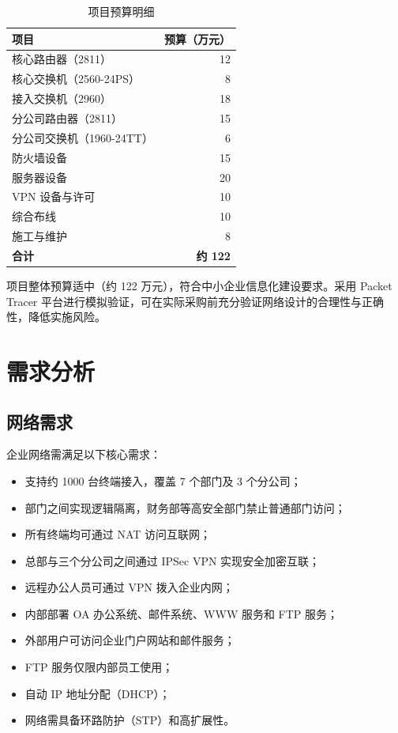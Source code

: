 \documentclass[12pt,a4paper]{ctexart}
\begin{document}
\begin{table}[H]
\centering
\caption{项目预算明细}
\begin{tabular}{|l|r|}
\hline
\textbf{项目}          & \textbf{预算（万元）} \\ \hline
核心路由器（2811）      & 12                   \\ \hline
核心交换机（2560-24PS） & 8                    \\ \hline
接入交换机（2960）      & 18                   \\ \hline
分公司路由器（2811）    & 15                   \\ \hline
分公司交换机（1960-24TT）& 6                    \\ \hline
防火墙设备              & 15                   \\ \hline
服务器设备              & 20                   \\ \hline
VPN 设备与许可          & 10                   \\ \hline
综合布线                & 10                   \\ \hline
施工与维护              & 8                    \\ \hline
\textbf{合计}          & \textbf{约 122}      \\ \hline
\end{tabular}
\end{table}

项目整体预算适中（约 122 万元），符合中小企业信息化建设要求。采用 Packet Tracer 平台进行模拟验证，可在实际采购前充分验证网络设计的合理性与正确性，降低实施风险。

\section{需求分析}

\subsection{网络需求}

企业网络需满足以下核心需求：

\begin{itemize}
    \item 支持约 1000 台终端接入，覆盖 7 个部门及 3 个分公司；
    \item 部门之间实现逻辑隔离，财务部等高安全部门禁止普通部门访问；
    \item 所有终端均可通过 NAT 访问互联网；
    \item 总部与三个分公司之间通过 IPSec VPN 实现安全加密互联；
    \item 远程办公人员可通过 VPN 拨入企业内网；
    \item 内部部署 OA 办公系统、邮件系统、WWW 服务和 FTP 服务；
    \item 外部用户可访问企业门户网站和邮件服务；
    \item FTP 服务仅限内部员工使用；
    \item 自动 IP 地址分配（DHCP）；
    \item 网络需具备环路防护（STP）和高扩展性。
\end{itemize}
\end{document}
